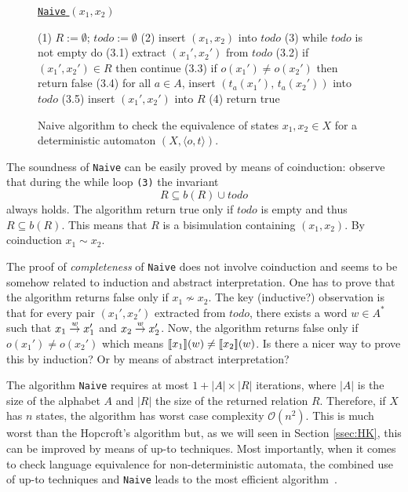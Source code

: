 \documentclass[smallcondensed,envcountsect,envcountsame]{svjour3}     %
\begin{document}
\begin{figure}[t]
\centering
\underline{\texttt{Naive} $(x_1,x_2)$}
\begin{codeNT}
(1) $R := \emptyset$; $todo := \emptyset$
(2) insert $(x_1,x_2)$ into $todo$
(3) while $todo$ is not empty do 
   (3.1)  extract $(x_1',x_2')$ from $todo$
   (3.2)  if $(x_1',x_2')\in R$ then continue
   (3.3)  if $o(x_1')\neq o(x_2')$ then return false
   (3.4)  for all $a\in A$, 
             insert $(t_a(x_1'),\,t_a(x_2'))$ into $todo$
   (3.5)  insert $(x_1',x_2')$ into $R$ 
(4) return true
\end{codeNT}
\caption{Naive algorithm to check the equivalence of states $x_1,x_2\in X$ for a deterministic automaton $(X,\langle o,t\rangle )$.}
\label{fig:naive}
\end{figure}
 The soundness of \texttt{Naive} can be easily proved by means of coinduction: observe that during the while loop \texttt{(3)} the invariant 
 $$R\subseteq b(R) \cup todo$$
always holds. The algorithm return true only if $todo$ is empty and thus $R\subseteq b(R)$. This means that $R$ is a bisimulation containing $(x_1,x_2)$. By coinduction $x_1\sim x_2$. 

\begin{question}
The proof of \emph{completeness} of \texttt{Naive} does not involve coinduction and seems to be somehow related to induction and abstract interpretation. One has to prove that the algorithm returns false only if $x_1\not \sim x_2$. The key (inductive?) observation is that for every pair $(x_1',x_2')$ extracted from $todo$, there exists a word $w\in A^*$ such that $x_1 \stackrel{w}{\to}x_1'$ and $x_2 \stackrel{w}{\to}x_2'$. Now, the algorithm returns false only if $o(x_1') \neq o(x_2')$ which means $[\![ x_1 ]\!](w)\neq [\![ x_2 ]\!](w)$. Is there a nicer way to prove this by induction? Or by means of abstract interpretation?
\end{question}

The algorithm \texttt{Naive} requires at most $1 + |A| \times |R|$ iterations, where $|A|$ is the size of the alphabet $A$ and $|R|$ the size of the returned relation $R$. Therefore, if $X$ has $n$ states, the algorithm has worst case complexity $\mathcal{O}(n^2)$. This is much worst than the Hopcroft's algorithm but, as we will seen in Section \ref{ssec:HK}, this can be improved by means of up-to techniques. Most importantly, when it comes to check language equivalence for non-deterministic automata, the combined use of up-to techniques and \texttt{Naive} leads to the most efficient algorithm~\cite{bp:popl13:hkc}.
\end{document}
